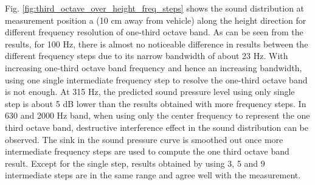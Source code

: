 Fig. \ref{fig:third_octave_over_height_freq_steps} shows the sound distribution at measurement position a (10 cm away from vehicle) along the height direction for different frequency resolution of one-third octave band. As can be seen from the results, for 100 Hz, there is almost no noticeable difference in results between the different frequency steps due to its narrow bandwidth of about 23 Hz. With increasing one-third octave band frequency and hence an increasing bandwidth, using one single intermediate frequency step to resolve the one-third octave band is not enough. At 315 Hz, the predicted sound pressure level using only single step is about 5 dB lower than the results obtained with more frequency steps. In 630 and 2000 Hz band, when using only the center frequency to represent the one third octave band, destructive interference effect in the sound distribution can be observed. The sink in the sound pressure curve is smoothed out once more intermediate frequency steps are used to compute the one third octave band result. Except for the single step, results obtained by using 3, 5 and 9 intermediate steps are in the same range and agree well with the measurement.

